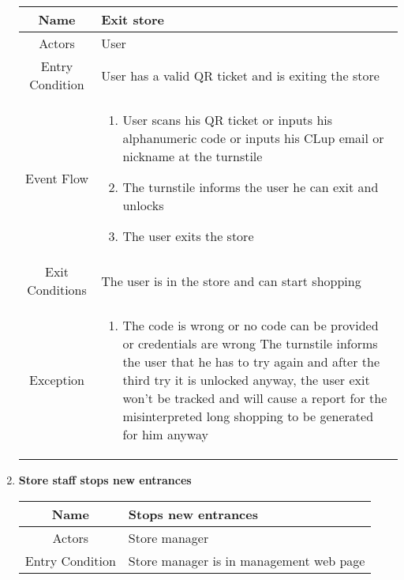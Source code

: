 \begin{enumerate}
\begin{table}[H]
	{
		\begin{tabular}{|c|p{14cm}|}
			\hline
			Name & Exit store\\
			\hline
			Actors & User\\
			\hline
			Entry Condition & User has a valid QR ticket and is exiting the store\\
			\hline
			
			Event Flow & \begin{enumerate}
				\item User scans his QR ticket or inputs his alphanumeric code or inputs his CLup email or nickname at the turnstile
				\item The turnstile informs the user he can exit and unlocks
				\item The user exits the store
				
			\end{enumerate}\\
			
			\hline
			Exit Conditions & The user is in the store and can start shopping\\
			\hline
			
			Exception & \begin{enumerate}
				\item The code is wrong or no code can be provided or credentials are wrong\newline
				The turnstile informs the user that he has to try again and after the third try it is unlocked anyway, the user exit won’t be tracked and will cause a report for the misinterpreted long shopping to be generated for him anyway
				
				
			\end{enumerate}\\
			
			\hline
		\end{tabular}
	}
\end{table}

\item \textbf{Store staff stops new entrances}

\begin{table}[H]
	{
		\begin{tabular}{|c|p{14cm}|}
			\hline
			Name & Stops new entrances\\
			\hline
			Actors & Store manager\\
			\hline
			Entry Condition & Store manager is in management web page\\
			\hline
			

\end{tabular}}
\end{table}
\end{enumerate}
